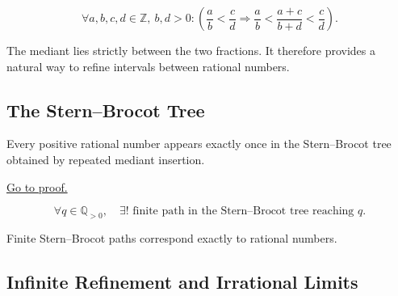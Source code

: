 \begin{remark*}

\[
\forall a,b,c,d\in\mathbb{Z},\ b,d>0:
\left(
\frac{a}{b}<\frac{c}{d}
\Rightarrow
\frac{a}{b}
<
\frac{a+c}{b+d}
<
\frac{c}{d}
\right).
\]

\end{remark*}

\begin{remark*}[Intuition]

The mediant lies strictly between the two fractions.
It therefore provides a natural way to refine intervals
between rational numbers.

\end{remark*}

\begin{exposition}
\bigskip
\end{exposition}

\subsection*{The Stern–Brocot Tree}

\begin{theorem}
\label{thm:stern-brocot}

Every positive rational number appears exactly once in the
Stern–Brocot tree obtained by repeated mediant insertion.

\hyperref[prf:stern-brocot]{Go to proof.}
\end{theorem}

\begin{remark*}

\[
\forall q\in\mathbb{Q}_{>0},
\quad
\exists ! \text{ finite path in the Stern–Brocot tree reaching } q.
\]

\end{remark*}

\begin{remark*}[Consequence]

Finite Stern–Brocot paths correspond exactly to rational numbers.

\end{remark*}

\begin{exposition}
\bigskip
\end{exposition}

\subsection*{Infinite Refinement and Irrational Limits}

